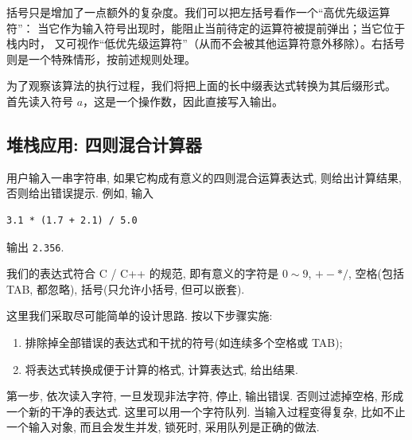 \documentclass[a4paper]{ctexart}
\theoremstyle{definition}
\theoremstyle{definition}
\begin{document}
\noindent
括号只是增加了一点额外的复杂度。我们可以把左括号看作一个“高优先级运算符”：
当它作为输入符号出现时，能阻止当前待定的运算符被提前弹出；当它位于栈内时，
又可视作“低优先级运算符”（从而不会被其他运算符意外移除）。右括号则是一个特殊情形，按前述规则处理。

\noindent
为了观察该算法的执行过程，我们将把上面的长中缀表达式转换为其后缀形式。
首先读入符号 $a$，这是一个操作数，因此直接写入输出。

\subsection{堆栈应用: 四则混合计算器}

用户输入一串字符串, 如果它构成有意义的四则混合运算表达式, 则给出计算结果, 
否则给出错误提示. 例如, 输入
\begin{verbatim}
3.1 * (1.7 + 2.1) / 5.0
\end{verbatim}
输出 \verb|2.356|. 

我们的表达式符合 C / C++ 的规范, 即有意义的字符是 $0 \sim 9$, $+ - *
/$, 空格(包括 TAB, 都忽略), 括号(只允许小括号, 但可以嵌套).

这里我们采取尽可能简单的设计思路. 按以下步骤实施:

\begin{enumerate}
\item 排除掉全部错误的表达式和干扰的符号(如连续多个空格或 TAB);
\item 将表达式转换成便于计算的格式, 计算表达式, 给出结果.
\end{enumerate}

第一步, 依次读入字符, 一旦发现非法字符, 停止, 输出错误. 否则过滤掉空格,
形成一个新的干净的表达式. 这里可以用一个字符队列. 当输入过程变得复杂,
比如不止一个输入对象, 而且会发生并发, 锁死时, 采用队列是正确的做法.
\end{document}
